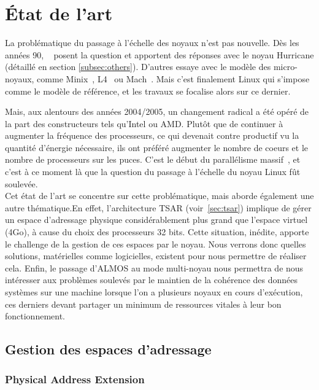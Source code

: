 \chapter{État de l’art}

  La problématique du passage à l’échelle des noyaux n’est pas nouvelle. Dès les
  années 90, ~\citeauthor{unrau1995hierarchical} posent la question et apportent
  des réponses avec le noyau Hurricane (détaillé en section
  \ref{subsec:others}). D’autres essaye avec le modèle des
  micro-noyaux, comme Minix~\citep{}, L4~\citep{} ou Mach~\citep{}. Mais c'est
  finalement Linux qui s’impose comme le modèle de référence, et les travaux se
  focalise alors sur ce dernier.

  Mais, aux alentours des années 2004/2005, un changement radical a été opéré de
  la part des constructeurs tels qu’Intel ou AMD. Plutôt que de continuer à
  augmenter la fréquence des processeurs, ce qui devenait contre productif vu la
  quantité d’énergie nécessaire, ils ont préféré augmenter le nombre de coeurs
  et le nombre de processeurs sur les puces. C'est le début du parallélisme
  massif~\citep{patterson2011parallel}, et c'est à ce moment là que la question
  du passage à l’échelle du noyau Linux fût soulevée.\\

  Cet état de l'art se concentre sur cette problématique, mais aborde également
  une autre thématique.En effet, l'architecture TSAR (voir~\ref{sec:tsar})
  implique de gérer un espace d'adressage physique considérablement plus grand
  que l'espace virtuel (4Go), à cause du choix des processeurs 32 bits. Cette
  situation, inédite, apporte le challenge de la gestion de ces espaces par le
  noyau. Nous verrons donc quelles solutions, matérielles comme logicielles,
  existent pour nous permettre de réaliser cela. Enfin, le passage d’ALMOS au
  mode multi-noyau nous permettra de nous intéresser aux problèmes soulevés par
  le maintien de la cohérence des données systèmes sur une machine lorsque l'on
  a plusieurs noyaux en cours d'exécution, ces derniers devant partager un
  minimum de ressources vitales à leur bon fonctionnement.


  \section{Gestion des espaces d'adressage}
  \label{sec:memory}    

    \subsection{Physical Address Extension}

